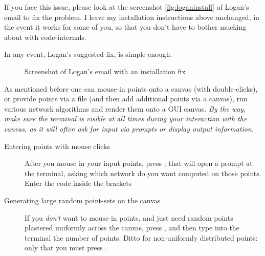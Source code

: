 \begin{appendices}
\begin{mdframed}[backgroundcolor=black!10,rightline=false,leftline=false]
If you face this issue, please look at the screenshot \autoref{fig:loganinstall} of Logan's email to fix the problem. 
I leave my installation instructions above unchanged, in the event it works for some of you, so that you don't have to bother
mucking about with code-internals. 

In any event, Logan's suggested fix, is simple enough. 
   
\begin{figure}[H]
  \centering
  \caption{\label{fig:loganinstall} Screenshot of Logan's email with an installation fix}
\end{figure}
\end{mdframed}



As mentioned before one can mouse-in points onto a canvas (with double-clicks), or provide points via a file (and then add additional points via a canvas), 
run various network algorithms and render them onto a GUI canvas. \textit{\footnotesize By the way, make sure the terminal is visible at all times during your 
interaction with the canvas, as it will often ask for input via prompts or display output information.}


\begin{description}
\item[Entering points with mouse clicks] After you  mouse in your input points, press ; that will open a prompt at the terminal, asking which 
network do  you want computed on those points. Enter the code inside the brackets  

\item[Generating large random point-sets on the canvas] If you \textit{don't} want to mouse-in points, and just need random points plastered uniformly across the canvas, 
press , and then type into the terminal the number of points. Ditto for non-uniformly distributed points: 
only that you must press . 


\end{description}
\end{appendices}
